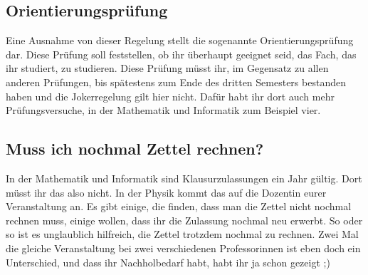 \subsection{Orientierungsprüfung}
Eine Ausnahme von dieser Regelung stellt die sogenannte Orientierungsprüfung dar. Diese Prüfung soll feststellen, ob ihr überhaupt geeignet seid, das Fach, das ihr studiert, zu studieren. Diese Prüfung müsst ihr, im Gegensatz zu allen anderen Prüfungen, bis spätestens zum Ende des dritten Semesters bestanden haben und die Jokerregelung gilt hier nicht. Dafür habt ihr dort auch mehr Prüfungsversuche, in der Mathematik und Informatik zum Beispiel vier.

\subsection{Muss ich nochmal Zettel rechnen?}
In der Mathematik und Informatik sind Klausurzulassungen ein Jahr gültig. Dort müsst ihr das also nicht. In der Physik kommt das auf die Dozentin eurer Veranstaltung an. Es gibt einige, die finden, dass man die Zettel nicht nochmal rechnen muss, einige wollen, dass ihr die Zulassung nochmal neu erwerbt. So oder so ist es unglaublich hilfreich, die Zettel trotzdem nochmal zu rechnen. Zwei Mal die gleiche Veranstaltung bei zwei verschiedenen Professorinnen ist eben doch ein Unterschied, und dass ihr Nachholbedarf habt, habt ihr ja schon gezeigt ;)
